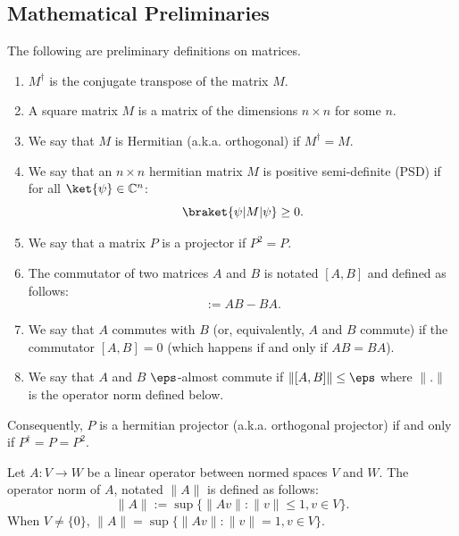 
\subsection{Mathematical Preliminaries}

\begin{definition}
    The following are preliminary definitions on matrices.
\begin{enumerate}
    \item $M^\dagger$ is the conjugate transpose of the matrix $M$.
    \item A square matrix $M$ is a matrix of the dimensions $n \times n$ for some $n$.
    \item We say that $M$ is Hermitian (a.k.a. orthogonal) if $M^\dagger = M$.
    \item We say that an $n \times n$ hermitian matrix $M$ is positive semi-definite (PSD) if for all $\ket{\psi} \in \mathbb{C}^n$:
    \begin{equation}
        \braket{\psi|M|\psi} \geq 0.
    \end{equation}
    \item We say that a matrix $P$ is a projector if $P^2 = P$.
    \item The commutator of two matrices $A$ and $B$ is notated $[A,B]$ and defined as follows:
        \begin{equation}
            [A, B] := AB - BA.
        \end{equation}
    \item We say that $A$ commutes with $B$ (or, equivalently, $A$ and $B$ commute) if the commutator $[A, B] = 0$ (which happens if and only if $AB = BA$).
    \item We say that $A$ and $B$ $\eps$-almost commute if $\|[A,B]\| \leq \eps$ where $\|.\|$ is the operator norm defined below.
\end{enumerate}
\end{definition}
\noindent Consequently, $P$ is a hermitian projector (a.k.a. orthogonal projector) if and only if $P^\dagger = P = P^2$.

\begin{definition}
    Let $A: V \to W$ be a linear operator between normed spaces $V$ and $W$. The operator norm of $A$, notated $\|A\|$ is defined as follows:
    \begin{equation}
        \|A\| := \sup\{\|Av\|: \|v\| \leq 1, v \in V\}.
    \end{equation}
    When $V \neq \{0\}$, $\|A\| = \sup\{\|Av\|: \|v\| = 1, v \in V\}$.
\end{definition}


